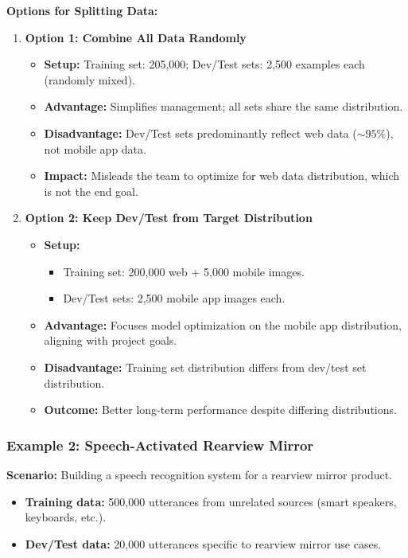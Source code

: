 \documentclass[letterpaper,12pt,notitlepage,twoside]{report}
\begin{document}
\textbf{Options for Splitting Data:}
\begin{enumerate}
    \item \textbf{Option 1: Combine All Data Randomly}
    \begin{itemize}
        \item \textbf{Setup:} Training set: 205,000; Dev/Test sets: 2,500 examples each (randomly mixed).
        \item \textbf{Advantage:} Simplifies management; all sets share the same distribution.
        \item \textbf{Disadvantage:} Dev/Test sets predominantly reflect web data ($\sim 95\%$), not mobile app data.
        \item \textbf{Impact:} Misleads the team to optimize for web data distribution, which is not the end goal.
    \end{itemize}
    
    \item \textbf{Option 2: Keep Dev/Test from Target Distribution}
    \begin{itemize}
        \item \textbf{Setup:}
        \begin{itemize}
            \item Training set: 200,000 web + 5,000 mobile images.
            \item Dev/Test sets: 2,500 mobile app images each.
        \end{itemize}
        \item \textbf{Advantage:} Focuses model optimization on the mobile app distribution, aligning with project goals.
        \item \textbf{Disadvantage:} Training set distribution differs from dev/test set distribution.
        \item \textbf{Outcome:} Better long-term performance despite differing distributions.
    \end{itemize}
\end{enumerate}

\subsubsection*{Example 2: Speech-Activated Rearview Mirror}
\textbf{Scenario:} Building a speech recognition system for a rearview mirror product.
\begin{itemize}
    \item \textbf{Training data:} 500,000 utterances from unrelated sources (smart speakers, keyboards, etc.).
    \item \textbf{Dev/Test data:} 20,000 utterances specific to rearview mirror use cases.
\end{itemize}
\end{document}
